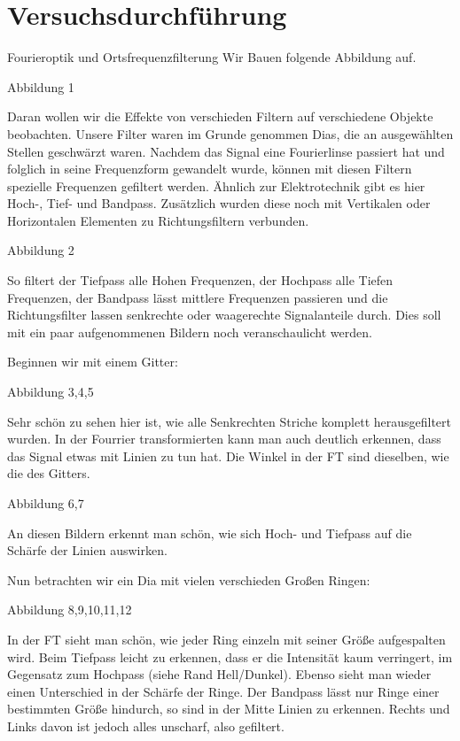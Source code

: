\chapter{Versuchsdurchführung}

Fourieroptik und Ortsfrequenzfilterung
Wir Bauen folgende Abbildung auf.


Abbildung 1



Daran wollen wir die Effekte von verschieden Filtern auf verschiedene Objekte beobachten.
Unsere Filter waren im Grunde genommen Dias, die an ausgewählten Stellen geschwärzt waren.
Nachdem das Signal eine Fourierlinse passiert hat und folglich in seine Frequenzform gewandelt wurde, können mit diesen Filtern spezielle Frequenzen gefiltert werden.
Ähnlich zur Elektrotechnik gibt es hier Hoch-, Tief- und Bandpass. 
Zusätzlich wurden diese noch mit Vertikalen oder Horizontalen Elementen zu Richtungsfiltern verbunden.

Abbildung 2

So filtert der Tiefpass alle Hohen Frequenzen, der Hochpass alle Tiefen Frequenzen, der Bandpass lässt mittlere Frequenzen passieren und die Richtungsfilter lassen senkrechte oder waagerechte Signalanteile durch.
Dies soll mit ein paar aufgenommenen Bildern noch veranschaulicht werden.


Beginnen wir mit einem Gitter:

Abbildung 3,4,5


Sehr schön zu sehen hier ist, wie alle Senkrechten Striche komplett herausgefiltert wurden.
In der Fourrier transformierten kann man auch deutlich erkennen, dass das Signal etwas mit Linien zu tun hat. Die Winkel in der FT sind dieselben, wie die des Gitters.

Abbildung 6,7

An diesen Bildern erkennt man schön, wie sich Hoch- und Tiefpass auf die Schärfe der Linien auswirken. 

Nun betrachten wir ein Dia mit vielen verschieden Großen Ringen:

Abbildung 8,9,10,11,12

In der FT sieht man schön, wie jeder Ring einzeln mit seiner Größe aufgespalten wird. Beim Tiefpass leicht zu erkennen, dass er die Intensität kaum verringert, im Gegensatz zum Hochpass (siehe Rand Hell/Dunkel). Ebenso sieht man wieder einen Unterschied in der Schärfe der Ringe. Der Bandpass lässt nur Ringe einer bestimmten Größe hindurch, so sind in der Mitte Linien zu erkennen. Rechts und Links davon ist jedoch alles unscharf, also gefiltert.

